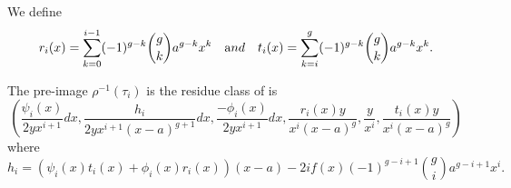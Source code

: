 \documentclass{beamer}
\begin{document}




\begin{frame}
We define 
\[
r_i(x) = \sum_{k=0}^{i-1} (-1)^{g-k} \binom{g}{k} a^{g-k}x^k \quad {\text and} \quad t_i(x) = \sum_{k=i}^g (-1)^{g-k}\binom{g}{k} a^{g-k}x^k.
\]
\begin{theorem}
The pre-image $\rho^{-1}(\tau_i)$ is the residue class of is
\begin{equation*}
\left( \frac{\psi_i(x)}{2yx^{i+1}}dx, \frac{h_i}{2yx^{i+1}(x-a)^{g+1}}dx, \frac{-\phi_i(x)}{2yx^{i+1}}dx, \frac{r_i(x)y}{x^i(x-a)^g}, \frac{y}{x^i}, \frac{t_i(x)y}{x^i(x-a)^g} \right)
\end{equation*}
where
\[
h_i = 
(\psi_i(x)t_i(x) + \phi_i(x)r_i(x))(x-a) - 2if(x)(-1)^{g-i+1}\binom{g}{i}a^{g-i+1}x^i.
\]
\end{theorem}

\end{frame}
\end{document}
